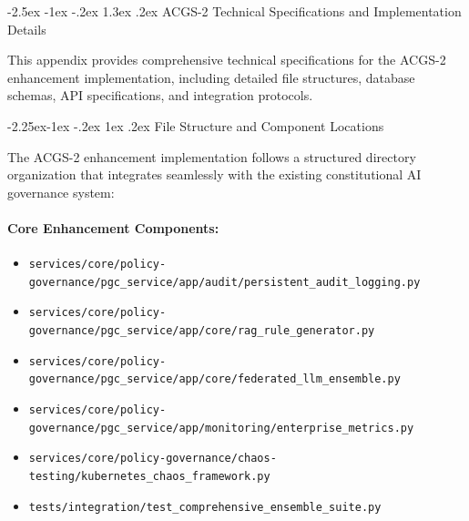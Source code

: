 \documentclass[manuscript,screen,9pt]{acmart}
\makeatletter
\renewcommand\section{\@startsection{section}{1}{\z@}%
  {-2.5ex \@plus -1ex \@minus -.2ex}%
  {1.3ex \@plus.2ex}%
  {\normalfont\Large\bfseries}}
\renewcommand\subsection{\@startsection{subsection}{2}{\z@}%
  {-2.25ex\@plus -1ex \@minus -.2ex}%
  {1ex \@plus .2ex}%
  {\normalfont\large\bfseries}}
\makeatother
\begin{document}




\appendix

\section{ACGS-2 Technical Specifications and Implementation Details}
\label{app:acgs2_technical_specifications}

This appendix provides comprehensive technical specifications for the ACGS-2 enhancement implementation, including detailed file structures, database schemas, API specifications, and integration protocols.

\subsection{File Structure and Component Locations}
\label{app:file_structure}

The ACGS-2 enhancement implementation follows a structured directory organization that integrates seamlessly with the existing constitutional AI governance system:

\paragraph{Core Enhancement Components:}
\begin{itemize}[itemsep=1pt,parsep=1pt]
    \item \texttt{services/core/policy-governance/pgc\_service/app/audit/persistent\_audit\_logging.py}
    \item \texttt{services/core/policy-governance/pgc\_service/app/core/rag\_rule\_generator.py}
    \item \texttt{services/core/policy-governance/pgc\_service/app/core/federated\_llm\_ensemble.py}
    \item \texttt{services/core/policy-governance/pgc\_service/app/monitoring/enterprise\_metrics.py}
    \item \texttt{services/core/policy-governance/chaos-testing/kubernetes\_chaos\_framework.py}
    \item \texttt{tests/integration/test\_comprehensive\_ensemble\_suite.py}
\end{itemize}
\end{document}
